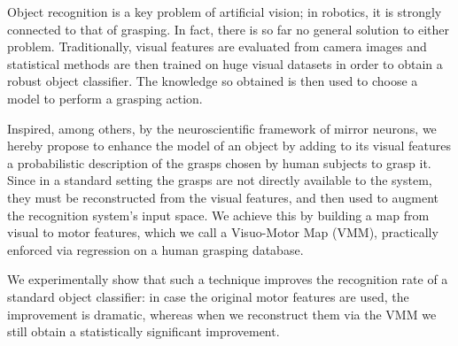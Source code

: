 Object recognition is a key problem of artificial vision; in robotics, it
is strongly connected to that of grasping. In fact, there is so far no
general solution to either problem. Traditionally,
visual features are evaluated from camera images and statistical methods
are then trained on huge visual datasets in order to obtain a robust object
classifier. The knowledge so obtained is then used to choose a model to
perform a grasping action.

Inspired, among others, by the neuroscientific framework of mirror neurons,
we hereby propose to enhance the model of an object by adding to its visual
features a probabilistic description of the grasps chosen by human subjects
to grasp it. %
Since in a standard setting the grasps are not directly
available to the system, they must be reconstructed from the visual features,
and then used to augment the recognition system's input space. We achieve
this by building a map from visual to motor features, which
we call a Visuo-Motor Map (VMM), practically enforced via regression on a
human grasping database.

We experimentally show that such a technique improves the
recognition rate of a standard object classifier: in case the original motor
features are used, the improvement is dramatic, whereas when we reconstruct
them via the VMM we still obtain a statistically significant improvement.
